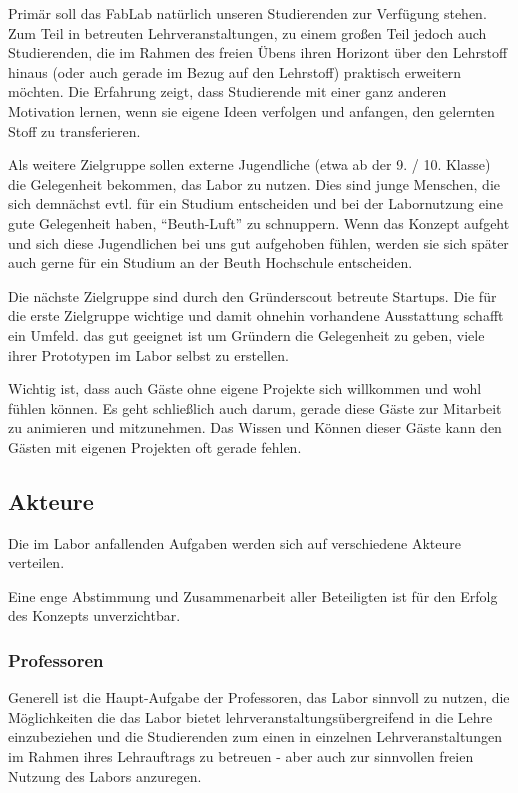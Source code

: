 \documentclass[parskip=half,headsepline,footsepline,titlepage]{scrartcl}
\begin{document}
Primär soll das FabLab natürlich unseren Studierenden zur Verfügung stehen. Zum Teil in betreuten Lehrveranstaltungen, zu einem großen Teil jedoch auch Studierenden, die im Rahmen des freien Übens ihren Horizont über den Lehrstoff hinaus (oder auch gerade im Bezug auf den Lehrstoff) praktisch erweitern möchten. Die Erfahrung zeigt, dass Studierende mit einer ganz anderen Motivation lernen, wenn sie eigene Ideen verfolgen und anfangen, den gelernten Stoff zu transferieren.

\label{p:zielgruppe-extern}Als weitere Zielgruppe sollen externe Jugendliche (etwa ab der 9. / 10. Klasse) die Gelegenheit bekommen, das Labor zu nutzen. Dies sind junge Menschen, die sich demnächst evtl. für ein Studium entscheiden und bei der Labornutzung eine gute Gelegenheit haben, ``Beuth-Luft'' zu schnuppern. Wenn das Konzept aufgeht und sich diese Jugendlichen bei uns gut aufgehoben fühlen, werden sie sich später auch gerne für ein Studium an der Beuth Hochschule entscheiden.

Die nächste Zielgruppe sind durch den Gründerscout betreute Startups. Die für die erste Zielgruppe wichtige und damit ohnehin vorhandene Ausstattung schafft ein Umfeld. das gut geeignet ist um Gründern die Gelegenheit zu geben, viele ihrer Prototypen im Labor selbst zu erstellen.

Wichtig ist, dass auch Gäste ohne eigene Projekte sich willkommen und wohl fühlen können. Es geht schließlich auch darum, gerade diese Gäste zur Mitarbeit zu animieren und mitzunehmen. Das Wissen und Können dieser Gäste kann den Gästen mit eigenen Projekten oft gerade fehlen.

\subsection{Akteure}
Die im Labor anfallenden Aufgaben werden sich auf verschiedene Akteure verteilen. 

Eine enge Abstimmung und Zusammenarbeit aller Beteiligten ist für den Erfolg des Konzepts unverzichtbar.

\subsubsection{Professoren}

Generell ist die Haupt-Aufgabe der Professoren, das Labor sinnvoll zu nutzen, die Möglichkeiten die das Labor bietet lehrveranstaltungsübergreifend in die Lehre einzubeziehen und die Studierenden zum einen in einzelnen Lehrveranstaltungen im Rahmen ihres Lehrauftrags zu betreuen - aber auch zur sinnvollen freien Nutzung des Labors anzuregen.
\end{document}
